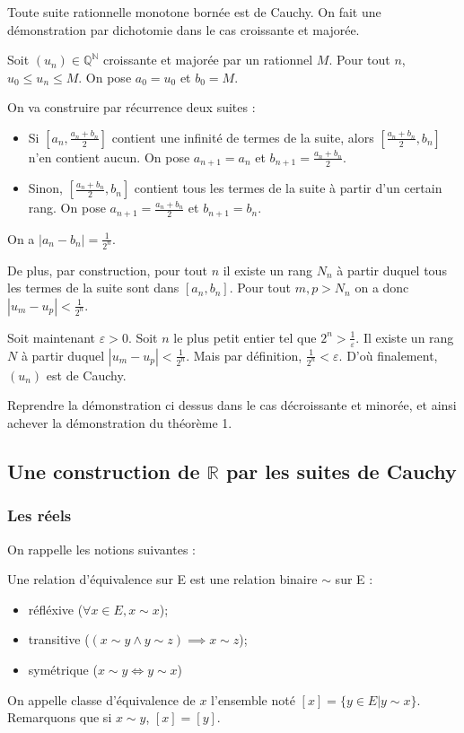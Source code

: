 \begin{theoreme}
Toute suite rationnelle monotone bornée est de Cauchy.
\tcblower
On fait une démonstration par dichotomie dans le cas croissante et majorée.

Soit $(u_n) \in \mathbb{Q}^{\mathbb{N}}$ croissante et majorée par un rationnel $M$. Pour tout $n$, $u_0\leq u_n \leq M$. On pose $a_0=u_0$ et $b_0=M$.

On va construire par récurrence deux suites :
\begin{itemize}
    \item Si $[a_n, \frac{a_n+b_n}{2}]$ contient une infinité de termes de la suite, alors $[\frac{a_n+b_n}{2}, b_n]$ n'en contient aucun. On pose $a_{n+1}=a_n$ et $b_{n+1}=\frac{a_n+b_n}{2}$.
    \item Sinon, $[\frac{a_n+b_n}{2}, b_n]$ contient tous les termes de la suite à partir d'un certain rang. On pose $a_{n+1}=\frac{a_n+b_n}{2}$ et $b_{n+1}=b_n$.
\end{itemize}

On a $|a_n-b_n| = \frac{1}{2^n}$.

De plus, par construction, pour tout $n$ il existe un rang $N_n$ à partir duquel tous les termes de la suite sont dans $[a_n, b_n]$. Pour tout $m,p > N_n$ on a donc $|u_m-u_p|<\frac{1}{2^n}$.

Soit maintenant $\varepsilon > 0$. Soit $n$ le plus petit entier tel que $2^n>\frac{1}{\varepsilon}$. Il existe un rang $N$ à partir duquel $|u_m-u_p|<\frac{1}{2^n}$. Mais par définition, $\frac{1}{2^n}<\varepsilon$. D'où finalement, $(u_n)$ est de Cauchy.
\end{theoreme}
\begin{exo}
    Reprendre la démonstration ci dessus dans le cas décroissante et minorée, et ainsi achever la démonstration du théorème 1.
\end{exo}

\subsection{Une construction de \texorpdfstring{$\mathbb{R}$}{R} par les suites de Cauchy}
\subsubsection{Les réels}
On rappelle les notions suivantes :
\begin{defini}
Une relation d'équivalence sur E est une relation binaire $\sim$ sur E :
\begin{itemize}
\item réfléxive ($\forall x\in E, x\sim x$);
\item transitive ($(x\sim y \land y\sim z) \implies x\sim z$);
\item symétrique ($x\sim y \iff y\sim x$)
\end{itemize}

On appelle classe d'équivalence de $x$ l'ensemble noté $[x]=\{y\in E|y\sim x\}$. Remarquons que si $x\sim y$, $[x]=[y]$.
\end{defini}

